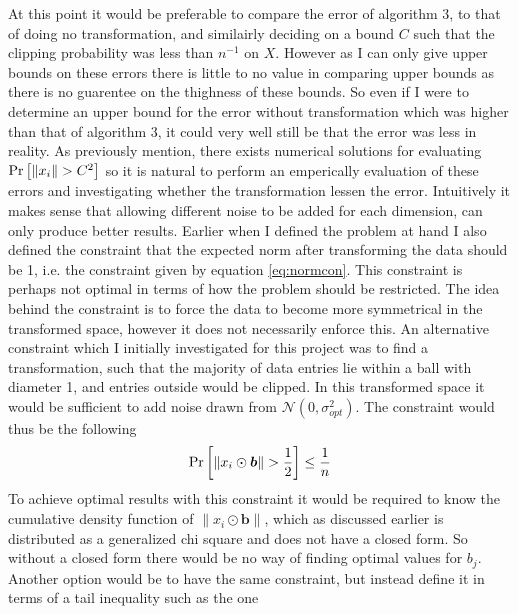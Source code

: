 \documentclass[a4paper,12pt]{article}
\begin{document}
At this point it would be preferable to compare the error of algorithm 3, to that of doing no transformation, and similairly deciding on a bound $C$ 
such that the clipping probability was less than $n^{-1}$ on $X$. However as I can only give upper bounds on these errors there is little to no value in comparing 
upper bounds as there is no guarentee on the thighness of these bounds. So even if I were to determine an upper bound for the error without transformation which was higher than that of algorithm 3, 
it could very well still be that the error was less in reality.
As previously mention, there exists numerical solutions for evaluating $\Pr\left [\|x_i\| > C^2 \right]$ so it is natural to perform an emperically evaluation of these errors
 and investigating whether the transformation lessen the error.
Intuitively it makes sense that allowing different noise to be added for each dimension, can only produce better results.
Earlier when I defined the problem at hand I also defined the constraint that the expected norm after 
transforming the data should be 1, i.e. the constraint given by equation \eqref{eq:normcon}. 
This constraint is perhaps not optimal in terms of how the problem should be restricted. The idea behind the constraint
is to force the data to become more symmetrical in the transformed space, however it does not necessarily enforce this. 
An alternative constraint which I initially investigated for this project was to find a transformation, such that the majority of 
data entries lie within a ball with diameter 1, and entries outside would be clipped.
In this transformed space it would be sufficient to add noise drawn from
$\mathcal{N}(0, \sigma_{opt}^2)$. The constraint would thus be the following
\begin{equation}
\label{eq:AltCon}
    \Pr\left [ \| x_i \odot \bm{b} \| > \frac{1}{2} \right] \le \frac{1}{n} 
\end{equation}
To achieve optimal results with this constraint it would be required to know the cumulative density function of $\| x_i \odot \bm{b} \|$, 
which as discussed earlier is distributed as a generalized chi square and does not have a closed form. 
So without a closed form there would be no way of finding optimal values for $b_j$. 
Another option would be to have the same constraint, but instead define it in terms of a tail inequality such as the one
\end{document}

